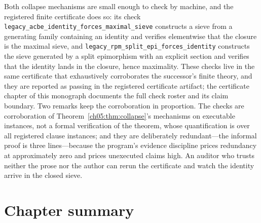 Both collapse mechanisms are small enough to check by machine, and the
registered finite certificate does so: its check
\texttt{legacy\_acbe\_identity\_forces\_maximal\_sieve} constructs a sieve
from a generating family containing an identity and verifies elementwise
that the closure is the maximal sieve, and
\texttt{legacy\_rpm\_split\_epi\_forces\_identity} constructs the sieve
generated by a split epimorphism with an explicit section and verifies that
the identity lands in the closure, hence maximality. These checks live in
the same certificate that exhaustively corroborates the successor's finite
theory, and they are reported as passing in the registered certificate
artifact; the certificate chapter of this monograph documents the full
check roster and its claim boundary. Two remarks keep the corroboration in
proportion. The checks are corroboration of
Theorem~\ref{ch05:thm:collapse}'s mechanisms on executable instances, not a
formal verification of the theorem, whose quantification is over all
registered clause instances; and they are deliberately redundant---the
informal proof is three lines---because the program's evidence discipline
prices redundancy at approximately zero and prices unexecuted claims high.
An auditor who trusts neither the prose nor the author can rerun the
certificate and watch the identity arrive in the closed sieve.

\section{Chapter summary}\label{ch05:sec:summary}

